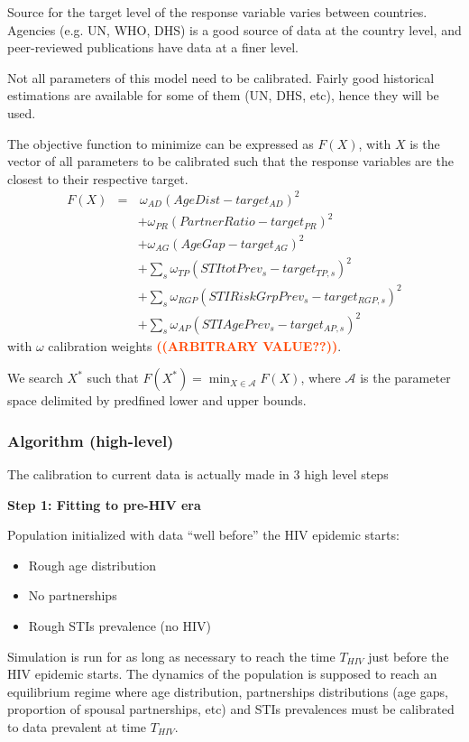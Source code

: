\documentclass[11pt, onecolumn]{article}
\newcommand{\warning}[1]{\textbf{\textcolor{OrangeRed}{#1}}}
\begin{document}
Source for the target level of the response variable varies between countries. Agencies (e.g. UN, WHO, DHS) is a good source of data at the  country level, and peer-reviewed publications have data at a finer level.

Not all parameters of this model need to be calibrated. Fairly good historical estimations are available for some of them (UN, DHS, etc), hence they will be used. 

The objective function to minimize can be expressed as $F(X)$, with $X$ is the vector of all parameters to be calibrated such that the response variables are the closest to their respective target.
\begin{eqnarray*}
F(X) & =&\,\omega_{AD}(AgeDist - target_{AD})^2 \\
& & + \omega_{PR}(PartnerRatio - target_{PR})^2 \\
& & + \omega_{AG}(AgeGap - target_{AG})^2 \\
& & +\sum_s \omega_{TP}(STItotPrev_s-target_{TP,s})^2 \\
& & +\sum_s \omega_{RGP}(STIRiskGrpPrev_s-target_{RGP,s})^2\\
& & +\sum_s \omega_{AP}(STIAgePrev_s-target_{AP,s})^2
\end{eqnarray*}
with $\omega$ calibration weights \warning{((ARBITRARY VALUE??))}. 

We search $X^*$ such that $F(X^*)=\min_{X\in \mathcal{A}} F(X)$, where $\mathcal{A}$ is the parameter space delimited by predfined lower and upper bounds.

\subsubsection{Algorithm (high-level)}
The calibration to current data is actually made in 3 high level steps

\textbf{Step 1: Fitting to pre-HIV era}

Population initialized with data ``well before'' the HIV epidemic starts:
\begin{itemize}
\item Rough age distribution
\item No partnerships
\item Rough STIs prevalence (no HIV)
\end{itemize}

Simulation is run for as long as necessary to reach the time $T_{HIV}$ just before the HIV epidemic starts. The dynamics of the population is supposed to reach an equilibrium regime where age distribution, partnerships distributions (age gaps, proportion of spousal partnerships, etc) and STIs prevalences must be calibrated to data prevalent at time  $T_{HIV}$.
\end{document}
